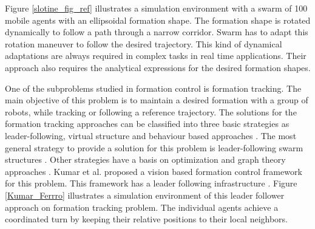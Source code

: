 Figure \ref{slotine_fig_ref} illustrates a simulation environment with a swarm of 100 mobile agents with an ellipsoidal formation shape. The formation shape is rotated dynamically to follow a path through a narrow corridor. Swarm has to adapt this  rotation maneuver to follow the desired trajectory. This kind of dynamical adaptations are always required in complex tasks in real time applications. Their approach also requires the analytical expressions for the desired formation shapes.

One of the subproblems studied in formation control is formation tracking. The main objective of this problem is to maintain a desired formation with a group of robots, while tracking or following a reference trajectory. The solutions for the formation tracking approaches can be classified into three basic strategies as leader-following, virtual structure and behaviour based approaches \cite{12}. The most general strategy to provide a solution for this problem is leader-following swarm structures \cite{18}. Other strategies have a basis on optimization and graph theory approaches \cite{12}. Kumar et al. proposed a vision based formation control framework  for this problem. This framework has a leader following infrastructure \cite{18}. Figure \ref{Kumar_Ferrro} illustrates a simulation environment of this leader follower approach on formation tracking problem. The individual agents achieve a coordinated turn by keeping their relative positions to their local neighbors. 

